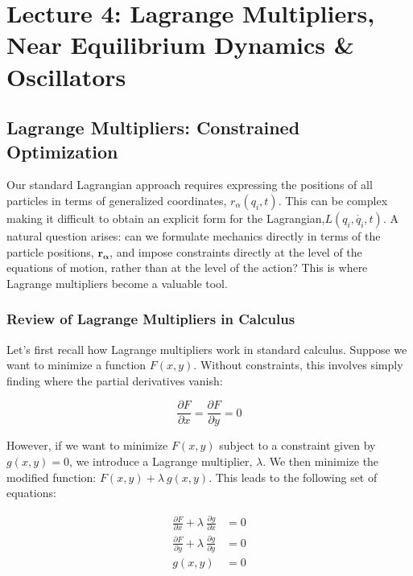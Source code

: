 \section{Lecture 4: Lagrange Multipliers, Near Equilibrium Dynamics \& Oscillators}

\subsection{Lagrange Multipliers: Constrained Optimization}

Our standard Lagrangian approach requires expressing the positions of all particles in terms of generalized coordinates, $r_\alpha\left(q_i, t\right)$. This can be complex making it difficult to obtain an explicit form for the Lagrangian,$L\left(q_i, \dot{q_i}, t\right)$. A natural question arises: can we formulate mechanics directly in terms of the particle positions, $\mathbf{r_\alpha}$, and impose constraints directly at the level of the equations of motion, rather than at the level of the action? This is where Lagrange multipliers become a valuable tool.

\subsubsection{Review of Lagrange Multipliers in Calculus}

Let's first recall how Lagrange multipliers work in standard calculus. Suppose we want to minimize a function $F\left(x, y\right)$. Without constraints, this involves simply finding where the partial derivatives vanish:

\begin{equation}
    \frac{\partial F}{\partial x} = \frac{\partial F}{\partial y} = 0
\end{equation}

However, if we want to minimize $F\left(x, y\right)$ subject to a constraint given by $g\left(x, y\right) = 0$, we introduce a Lagrange multiplier, $\lambda$.  We then minimize the modified function: $F\left(x, y\right) + \lambda \ g\left(x, y\right)$. This leads to the following set of equations:

\begin{align}
    \frac{\partial F}{\partial x} + \lambda \ \frac{\partial g}{\partial x} &= 0 \\
    \frac{\partial F}{\partial y} + \lambda \ \frac{\partial g}{\partial y} &= 0 \\
    g\left(x, y\right) &= 0 
\end{align}

